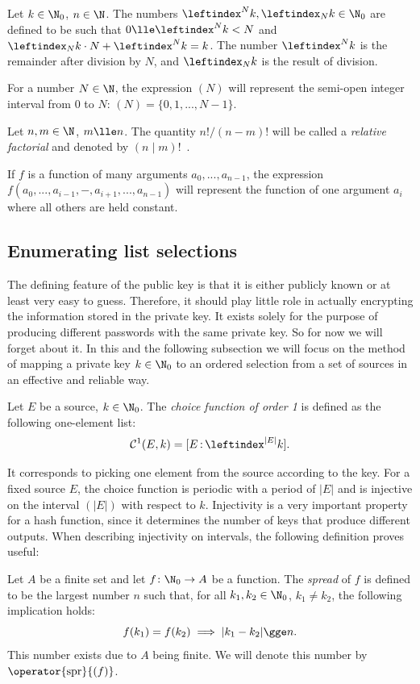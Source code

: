 \documentclass[12pt, a4paper]{article}
\renewcommand{\C}{\mathcal{C}}
\newcommand{\spr}[1]{\operator{\mathrm{spr}}{(#1)}}
\newcommand{\lli}[1]{\leftindex_{#1}}
\newcommand{\lui}[1]{\leftindex^{#1}}
\newcommand{\elt}{\mathop{:}}
\begin{document}
Let $ k \in \N_0 $, $ n \in \N $. The numbers $ \lui{N}k, \lli{N}k \in \N_0 $ are defined to be such that $ 0 \lle \lui{N}k < N $ and $ \lli{N}k \cdot N + \lui{N}k = k $. The number $ \lui{N}k $ is the remainder after division by $ N $, and $ \lli{N}k $ is the result of division.

For a number $ N \in \N $, the expression $ (N) $ will represent the semi-open integer interval from 0 to $ N $: $ (N) = \{0, 1, ..., N-1\} $.

Let $ n, m \in \N $, $ m \lle n $. The quantity $ n!/(n-m)! $ will be called a \emph{relative factorial} and denoted by $ (n \mid m)! $\ .

If $ f $ is a function of many arguments $ a_0, ..., a_{n-1} $, the expression $ f(a_0, ..., a_{i-1}, -, a_{i+1}, ..., a_{n-1}) $ will represent the function of one argument $ a_i $ where all others are held constant.

\subsection{Enumerating list selections}

The defining feature of the public key is that it is either publicly known or at least very easy to guess. Therefore, it should play little role in actually encrypting the information stored in the private key. It exists solely for the purpose of producing different passwords with the same private key. So for now we will forget about it. In this and the following subsection we will focus on the method of mapping a private key $ k \in \N_0 $ to an ordered selection from a set of sources in an effective and reliable way.

\begin{definition}
    Let $ E $ be a source, $ k \in \N_0 $. The \emph{choice function of order 1} is defined as the following one-element list:
    \[ \C^1(E, k) = [E \elt \lui{|E|}k]. \]
\end{definition}

It corresponds to picking one element from the source according to the key. For a fixed source $ E $, the choice function is periodic with a period of $ |E| $ and is injective  on the interval $ (|E|) $ with respect to $ k $. Injectivity is a very important property for a hash function, since it determines the number of keys that produce different outputs. When describing injectivity on intervals, the following definition proves useful:

\begin{definition}
    Let $ A $ be a finite set and let $ f \colon \N_0 \to A $ be a function. The \emph{spread} of $ f $ is defined to be the largest number $ n $ such that, for all $ k_1, k_2 \in \N_0 $, $ k_1 \ne k_2 $, the following implication holds:
    \[ f(k_1) = f(k_2) \implies |k_1 - k_2| \gge n. \]
    This number exists due to $ A $ being finite. We will denote this number by $ \spr{f} $.
\end{definition}
\end{document}
